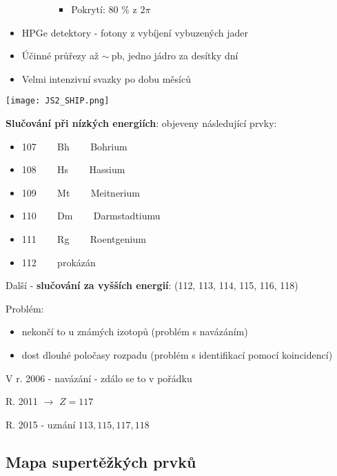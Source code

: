 \documentclass[../../main.tex]{subfiles}
\begin{document}
\begin{itemize}
\begin{itemize}
\begin{itemize}
    	     \begin{itemize}
    	     	\item Pokrytí: 80 $\%$ z $2 \pi$
    	     \end{itemize}
    	\end{itemize}
    \end{itemize}
    \item HPGe detektory - fotony z vybíjení vybuzených jader
    \item Účinné průřezy až $\sim ~\mathrm{pb}$, jedno jádro za desítky dní
    \item Velmi intenzivní svazky po dobu měsíců
\end{itemize}

\begin{center}
	\texttt{[image: JS2\_SHIP.png]}
\end{center}

\textbf{Slučování při nízkých energiích}: objeveny následující prvky:
\begin{itemize}
	\item 107 ~~~ Bh ~~~ Bohrium
	\item 108 ~~~ Hs ~~~ Hassium
	\item 109 ~~~ Mt ~~~ Meitnerium
	\item 110 ~~~ Dm ~~~ Darmstadtiumu
	\item 111 ~~~ Rg ~~~ Roentgenium
	\item 112 ~~~ prokázán
\end{itemize}

Další - \textbf{slučování za vyšších energií}: (112, 113, 114, 115, 116, 118)

Problém:
\begin{itemize}
	\item nekončí to u známých izotopů (problém s navázáním)
	\item dost dlouhé poločasy rozpadu (problém s identifikací pomocí koincidencí)
\end{itemize}	

V r. 2006 - navázání - zdálo se to v pořádku

R. 2011 $\rightarrow$ $Z = 117$

R. 2015 - uznání $113, 115, 117, 118$

\subsection{Mapa supertěžkých prvků}
\end{document}
